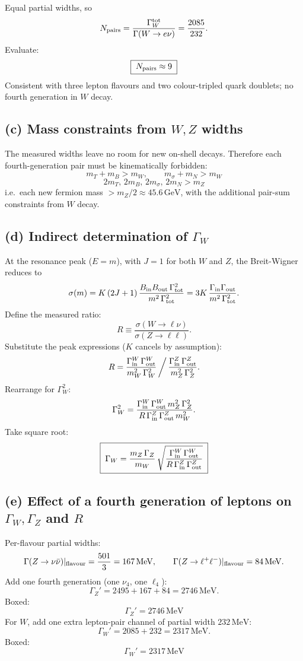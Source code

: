 \documentclass[11pt]{article}
\newcommand{\GeV}{\,\mathrm{GeV}}
\newcommand{\MeV}{\,\mathrm{MeV}}
\begin{document}
Equal partial widths, so
\[
N_{\rm pairs} = \frac{\Gamma_W^{\rm tot}}{\Gamma(W\to e\nu)} = \frac{2085}{232}.
\]
Evaluate:
\[
\boxed{\;N_{\rm pairs} \approx 9\;}
\]
Consistent with three lepton flavours and two colour-tripled quark doublets; no fourth generation in $W$ decay.

\subsection*{(c) Mass constraints from $W,Z$ widths}

The measured widths leave no room for new on-shell decays. Therefore each fourth-generation pair must be kinematically forbidden:
\[
\boxed{\;m_T+m_B > m_W,\qquad m_\sigma + m_N > m_W\;}
\]
\[
\boxed{\;2m_T,\,2m_B,\,2m_\sigma,\,2m_N > m_Z\;}
\]
i.e.\ each new fermion mass $> m_Z/2 \approx 45.6\GeV$, with the additional pair-sum constraints from $W$ decay.

\subsection*{(d) Indirect determination of $\Gamma_W$}

At the resonance peak ($E=m$), with $J=1$ for both $W$ and $Z$, the Breit-Wigner reduces to
\[
\sigma(m) = K\,(2J+1)\,\frac{B_{\rm in}B_{\rm out}\,\Gamma_{\rm tot}^2}{m^2\,\Gamma_{\rm tot}^2} = 3K\,\frac{\Gamma_{\rm in}\Gamma_{\rm out}}{m^2\,\Gamma_{\rm tot}^2}.
\]
Define the measured ratio:
\[
R \equiv \frac{\sigma(W\to\ell\nu)}{\sigma(Z\to\ell\ell)}.
\]
Substitute the peak expressions ($K$ cancels by assumption):
\[
R = \frac{\Gamma_{\rm in}^W\,\Gamma_{\rm out}^W}{m_W^2\,\Gamma_W^2}\,\bigg/\,\frac{\Gamma_{\rm in}^Z\,\Gamma_{\rm out}^Z}{m_Z^2\,\Gamma_Z^2}.
\]
Rearrange for $\Gamma_W^2$:
\[
\Gamma_W^2 = \frac{\Gamma_{\rm in}^W\,\Gamma_{\rm out}^W\,m_Z^2\,\Gamma_Z^2}{R\,\Gamma_{\rm in}^Z\,\Gamma_{\rm out}^Z\,m_W^2}.
\]
Take square root:
\[
\boxed{\;\Gamma_W = \frac{m_Z\,\Gamma_Z}{m_W}\,\sqrt{\frac{\Gamma_{\rm in}^W\,\Gamma_{\rm out}^W}{R\,\Gamma_{\rm in}^Z\,\Gamma_{\rm out}^Z}}\;}
\]

\subsection*{(e) Effect of a fourth generation of leptons on $\Gamma_W,\Gamma_Z$ and $R$}

Per-flavour partial widths:
\[
\Gamma(Z\to\nu\bar\nu)|_{\rm flavour} = \frac{501}{3} = 167\MeV,\qquad \Gamma(Z\to\ell^+\ell^-)|_{\rm flavour} = 84\MeV.
\]
Add one fourth generation (one $\nu_4$, one $\ell_4$):
\[
\Gamma_Z' = 2495 + 167 + 84 = 2746\MeV.
\]
Boxed:
\[
\boxed{\;\Gamma_Z' = 2746\MeV\;}
\]
For $W$, add one extra lepton-pair channel of partial width $232\MeV$:
\[
\Gamma_W' = 2085 + 232 = 2317\MeV.
\]
Boxed:
\[
\boxed{\;\Gamma_W' = 2317\MeV\;}
\]
\end{document}
